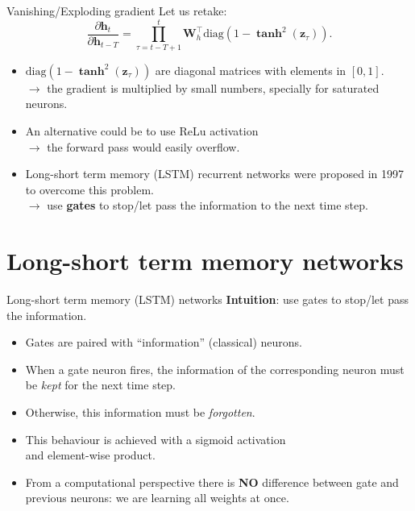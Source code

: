 \documentclass[aspectratio=169]{beamer}
\newcommand{\vect}[1]{\mathbf{#1}}
\begin{document}
\begin{frame}{Vanishing/Exploding gradient}
  Let us retake:
  $$\frac{\partial \vect{h}_t}{\partial \vect{h}_{t-T}} = \prod_{\tau=t-T+1}^t \vect{W}_h^\top \textrm{diag}(1-\boldsymbol{\tanh}^2(\vect{z}_\tau)).$$
  \begin{itemize}
   \item $\textrm{diag}(1-\boldsymbol{\tanh}^2(\vect{z}_\tau))$ are diagonal matrices with elements in $[0,1]$.\\
   $\rightarrow$ the gradient is multiplied by small numbers, specially for saturated neurons.
   \item An alternative could be to use ReLu activation\\
   $\rightarrow$ the forward pass would easily overflow.
   \item Long-short term memory (LSTM) recurrent networks were proposed in 1997 to overcome this problem.\\
   $\rightarrow$ use {\bf gates} to stop/let pass the information to the next time step.
  \end{itemize}
\end{frame}

\section{Long-short term memory networks}

\begin{frame}{Long-short term memory (LSTM) networks}
 \textbf{Intuition}: use gates to stop/let pass the information.\\
 \begin{itemize}
  \item Gates are paired with ``information'' (classical) neurons.
  \item When a gate neuron fires, the information of the corresponding neuron must be \textit{kept} for the next time step.
  \item Otherwise, this information must be \textit{forgotten}.
  \item This behaviour is achieved with a sigmoid activation\\ and element-wise product.
  \item From a computational perspective there is \textbf{NO} difference between gate and previous neurons: we are learning all weights at once.
 \end{itemize}
\end{frame}
\end{document}
